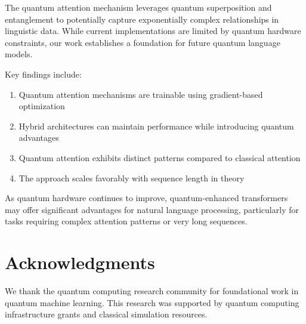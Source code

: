 \documentclass[11pt,twocolumn]{article}
\begin{document}
The quantum attention mechanism leverages quantum superposition and entanglement to potentially capture exponentially complex relationships in linguistic data. While current implementations are limited by quantum hardware constraints, our work establishes a foundation for future quantum language models.

Key findings include:
\begin{enumerate}
    \item Quantum attention mechanisms are trainable using gradient-based optimization
    \item Hybrid architectures can maintain performance while introducing quantum advantages
    \item Quantum attention exhibits distinct patterns compared to classical attention
    \item The approach scales favorably with sequence length in theory
\end{enumerate}

As quantum hardware continues to improve, quantum-enhanced transformers may offer significant advantages for natural language processing, particularly for tasks requiring complex attention patterns or very long sequences.

\section*{Acknowledgments}
We thank the quantum computing research community for foundational work in quantum machine learning. This research was supported by quantum computing infrastructure grants and classical simulation resources.
\end{document}
